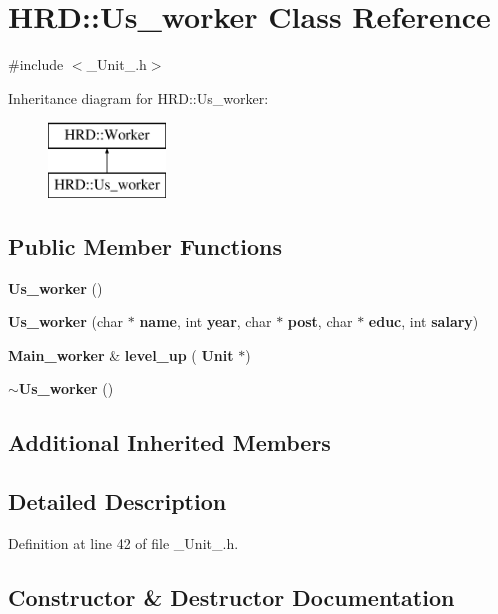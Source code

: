 \section{H\+RD\+:\+:Us\+\_\+worker Class Reference}
\label{class_h_r_d_1_1_us__worker}


{\ttfamily \#include $<$\+\_\+\+Unit\+\_\+.\+h$>$}

Inheritance diagram for H\+RD\+:\+:Us\+\_\+worker\+:\begin{figure}[H]
\begin{center}
\leavevmode
\includegraphics[height=2.000000cm]{class_h_r_d_1_1_us__worker}
\end{center}
\end{figure}
\subsection*{Public Member Functions}
\begin{DoxyCompactItemize}
\item 
\textbf{ Us\+\_\+worker} ()
\item 
\textbf{ Us\+\_\+worker} (char $\ast$\textbf{ name}, int \textbf{ year}, char $\ast$\textbf{ post}, char $\ast$\textbf{ educ}, int \textbf{ salary})
\item 
\textbf{ Main\+\_\+worker} \& \textbf{ level\+\_\+up} (\textbf{ Unit} $\ast$)
\item 
\textbf{ $\sim$\+Us\+\_\+worker} ()
\end{DoxyCompactItemize}
\subsection*{Additional Inherited Members}


\subsection{Detailed Description}


Definition at line 42 of file \+\_\+\+Unit\+\_\+.\+h.



\subsection{Constructor \& Destructor Documentation}
\mbox{\label{class_h_r_d_1_1_us__worker_a7e0c8b11ec80568a7905abd13b4681f5}} 
